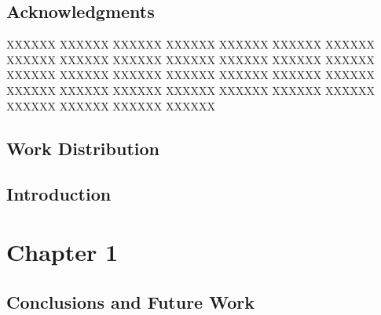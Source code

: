\documentclass[letterpaper,11pt]{report}
\begin{document}
\newpage



\section*{Acknowledgments}\label{section:acknowledgments}
\pagestyle{plain}

XXXXXX XXXXXX XXXXXX XXXXXX XXXXXX XXXXXX XXXXXX XXXXXX XXXXXX XXXXXX XXXXXX XXXXXX XXXXXX XXXXXX XXXXXX XXXXXX XXXXXX XXXXXX XXXXXX XXXXXX XXXXXX XXXXXX XXXXXX XXXXXX XXXXXX XXXXXX XXXXXX XXXXXX XXXXXX XXXXXX XXXXXX XXXXXX 

\vspace{2in}
\section*{Work Distribution}

\newpage

\tableofcontents



\newpage
\mbox{}



\section*{Introduction}\label{section:Introduction}
\chapter{Chapter 1}\label{chapter:Chapter 1}
\newpage
\section*{Conclusions and Future Work}
\setcounter{page}{1}
\onehalfspacing
\cite{Perugini:2007:SOI:1240624.1240770}


%

%
%


\end{document}

